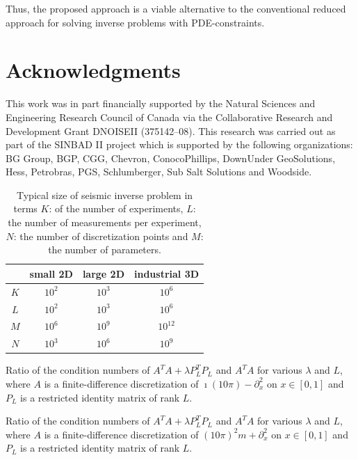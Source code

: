 \documentclass{iopart}
\begin{document}
Thus, the proposed approach is a viable alternative to the conventional reduced approach for solving inverse problems with PDE-constraints.

\section*{Acknowledgments}
This work was in part financially supported by the Natural Sciences and Engineering Research Council of Canada via the Collaborative Research and Development Grant DNOISEII (375142--08). This research was carried out as part of the SINBAD II project which is supported by the following organizations: BG Group, BGP, CGG, Chevron, ConocoPhillips, DownUnder GeoSolutions, Hess, Petrobras, PGS, Schlumberger, Sub Salt Solutions and Woodside.

\clearpage

\begin{table}
\centering
\begin{tabular}{c|c|c|c}
 	& small 2D 	& large 2D 	& industrial 3D 	\\
\hline
$K$	&   $10^2$	& $10^3$	&    $10^6$     	\\
$L$	&   $10^2$	& $10^3$	&	$10^6$			\\
$M$	&   $10^6$	& $10^9$	&	$10^{12}$		\\
$N$	&   $10^3$  & $10^6$	&	$10^9$			\\
\end{tabular}
\caption{Typical size of seismic inverse problem in terms $K$: of the number of experiments, $L$: the number of measurements per experiment, $N$: the number of discretization points and $M$: the number of parameters.}
\label{table:sizes}
\end{table}

\begin{table}
\centering

\caption{Ratio of the condition numbers of $A^T\!A + \lambda P_L^T\!P_L$ and $A^T\!A$ for various $\lambda$ and $L$, where $A$ is a finite-difference discretization of $\imath(10\pi) - \partial_x^2$ on $x\in [0,1]$ and $P_L$ is a restricted identity matrix of rank $L$. }
\label{table:example2}
\end{table}

\begin{table}
\centering

\caption{Ratio of the condition numbers of $A^T\!A + \lambda P_L^T\!P_L$ and $A^T\!A$ for various $\lambda$ and $L$, where $A$ is a finite-difference discretization of $(10\pi)^2 m + \partial_x^2$ on $x\in [0,1]$ and $P_L$ is a restricted identity matrix of rank $L$. }
\label{table:example3}
\end{table}
\end{document}
